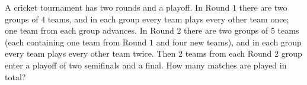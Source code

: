 A cricket tournament has two rounds and a playoff. In Round $1$ there are two groups of $4$ teams, and in each group every team plays every other team once; one team from each group advances. In Round $2$ there are two groups of $5$ teams (each containing one team from Round $1$ and four new teams), and in each group every team plays every other team twice. Then $2$ teams from each Round $2$ group enter a playoff of two semifinals and a final. How many matches are played in total?
